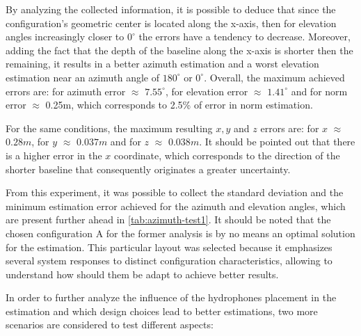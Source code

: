 By analyzing the collected information, it is possible to deduce that since the configuration's geometric center is located along the x-axis, then for elevation angles increasingly closer to $0^{\circ}$ the errors have a tendency to decrease. Moreover, adding the fact that the depth of the baseline along the x-axis is shorter then the remaining, it results in a better azimuth estimation and a worst elevation estimation near an azimuth angle of $180^{\circ}$ or $0^{\circ}$. Overall, the maximum achieved errors are: for azimuth error $\approx$ $7.55^{\circ}$, for elevation error $\approx$ $1.41^{\circ}$ and for norm error $\approx$ 0.25m, which corresponds to 2.5\% of error in norm estimation.

For the same conditions, the maximum resulting $x, y$ and $z$ errors are: for $x$ $\approx$ $0.28m$, for $y$ $\approx$ $0.037m$ and for $z$ $\approx$ $0.038m$. It should be pointed out that there is a higher error in the $x$ coordinate, which corresponds to the direction of the shorter baseline that consequently originates a greater uncertainty.

From this experiment, it was possible to collect the standard deviation and the minimum estimation error achieved for the azimuth and elevation angles, which are present further ahead in \ref{tab:azimuth-test1}. It should be noted that the chosen configuration A for the former analysis is by no means an optimal solution for the estimation. This particular layout was selected because it emphasizes several system responses to distinct configuration characteristics, allowing to understand how should them be adapt to achieve better results.

In order to further analyze the influence of the hydrophones placement in the estimation and which design choices lead to better estimations, two more scenarios are considered to test different aspects:

